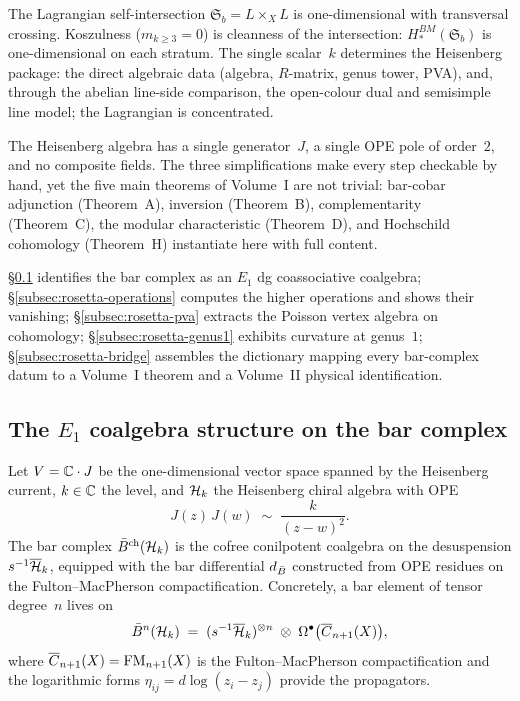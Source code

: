 The Lagrangian self-intersection $\mathfrak{S}_b = L \times_X L$ is one-dimensional with transversal crossing. Koszulness ($m_{k \ge 3} = 0$) is cleanness of the intersection: $H_*^{BM}(\mathfrak{S}_b)$ is one-dimensional on each stratum. The single scalar~$k$ determines the Heisenberg package: the direct algebraic data (algebra, $R$-matrix, genus tower, PVA), and, through the abelian line-side comparison, the open-colour dual and semisimple line model; the Lagrangian is concentrated.

The Heisenberg algebra has a single generator~$J$, a single OPE pole of order~$2$, and no composite fields. The three simplifications make every step checkable by hand, yet the five main theorems of Volume~I are not trivial: bar-cobar adjunction (Theorem~A), inversion (Theorem~B), complementarity (Theorem~C), the modular characteristic (Theorem~D), and Hochschild cohomology (Theorem~H) instantiate here with full content.

\S\ref{subsec:rosetta-e1-coalgebra} identifies the bar complex as an $E_1$ dg coassociative coalgebra; \S\ref{subsec:rosetta-operations} computes the higher operations and shows their vanishing; \S\ref{subsec:rosetta-pva} extracts the Poisson vertex algebra on cohomology; \S\ref{subsec:rosetta-genus1} exhibits curvature at genus~$1$; \S\ref{subsec:rosetta-bridge} assembles the dictionary mapping every bar-complex datum to a Volume~I theorem and a Volume~II physical identification.


\subsection{The $E_1$ coalgebra structure on the bar complex}
\label{subsec:rosetta-e1-coalgebra}

Let $V = \mathbb{C} \cdot J$ be the one-dimensional vector space spanned by the Heisenberg current, $k \in \mathbb{C}$ the level, and $\mathcal{H}_k$ the Heisenberg chiral algebra with OPE
\begin{equation}\label{eq:rosetta-heisenberg-ope}
J(z)\, J(w) \;\sim\; \frac{k}{(z - w)^2}.
\end{equation}
The bar complex $\bar{B}^{\mathrm{ch}}(\mathcal{H}_k)$ is the cofree
conilpotent coalgebra on the desuspension $s^{-1}\overline{\mathcal{H}}_k$,
equipped with the bar differential $d_{\bar{B}}$ constructed from
OPE residues on the Fulton--MacPherson compactification.
Concretely, a bar element of tensor degree~$n$ lives on
\begin{equation}\label{eq:rosetta-bar-element-space}
\bar{B}^n(\mathcal{H}_k) \;=\;
(s^{-1}\overline{\mathcal{H}}_k)^{\otimes n}
\;\otimes\;
\Omega^{\bullet}\bigl(\overline{C}_{n+1}(X)\bigr),
\end{equation}
where $\overline{C}_{n+1}(X) = \mathrm{FM}_{n+1}(X)$ is the
Fulton--MacPherson compactification and the logarithmic forms
$\eta_{ij} = d\log(z_i - z_j)$ provide the propagators.

